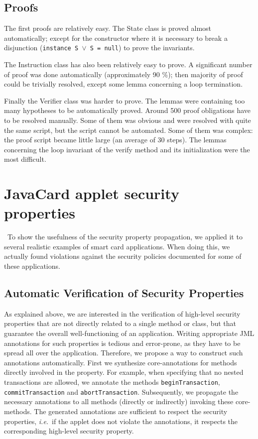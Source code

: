 \subsection{Proofs}
The first proofs are relatively easy. 
The State class is proved almost automatically; 
except for the constructor where it is necessary to break a disjunction ({\tt instance S $\vee$ S = null}) to prove the invariants.

The Instruction class has also been relatively easy to prove. 
A significant number of proof was done automatically (approximately 90 \%); 
then majority of proof could be trivially resolved, except some lemma concerning  a loop termination.    

Finally the Verifier class was harder to prove.
The lemmas were containing too many hypotheses to be automatically proved.
Around 500 proof obligations have to be resolved manually.
Some of them was obvious and were resolved with quite the same script, but the script cannot be automated.
Some of them was complex: the proof script became little large (an average of 30 steps).
The lemmas concerning the loop invariant of the verify method and its initialization were the most difficult.
\section{JavaCard applet security properties}\
To show the usefulness of the security property propagation, we applied it to
several realistic examples of smart card applications. When doing
this, we actually found violations against the security policies
documented for some of these applications.

\subsection{Automatic Verification of Security Properties}\label{SecVerif}
As explained above, we are interested in the verification of
high-level security properties that are not directly related to a
single method or class, but that guarantee the overall
well-functioning of an application. Writing appropriate JML
annotations for such properties is tedious and error-prone, as they
have to be spread all over the application. Therefore, we propose a
way to construct such annotations automatically. First we synthesize
core-annotations for methods directly involved in the property.  For
example, when specifying that no nested transactions are allowed, we
annotate the methods \texttt{beginTransaction},
\texttt{commitTransaction} and
\texttt{abortTransaction}. Subsequently, we propagate the necessary 
annotations to all methods (directly or indirectly) invoking these
core-methods.  The generated annotations are sufficient to respect the
security properties, \emph{i.e.}~if the applet does not violate the
annotations, it respects the corresponding high-level security
property.


